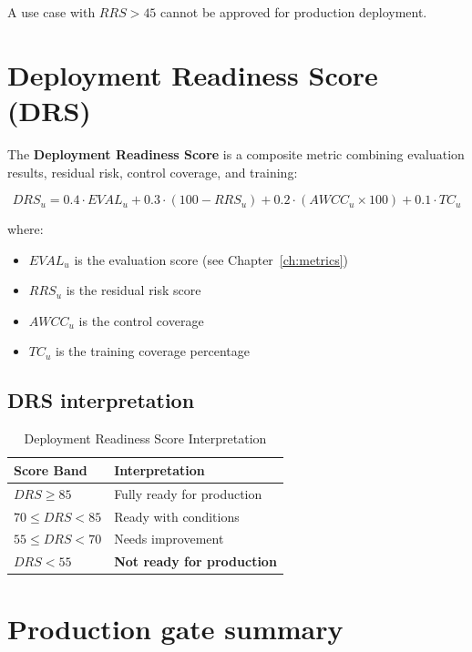 \begin{tcolorbox}[colback=sgred!5,colframe=sgred!70,title=\faIcon{exclamation-circle} Production Gate]
A use case with $RRS > 45$ cannot be approved for production deployment.
\end{tcolorbox}

\section{Deployment Readiness Score (DRS)}

The \textbf{Deployment Readiness Score} is a composite metric combining
evaluation results, residual risk, control coverage, and training:

\begin{equation}
\boxed{
DRS_u = 0.4 \cdot EVAL_u + 0.3 \cdot (100 - RRS_u) + 0.2 \cdot (AWCC_u \times 100) + 0.1 \cdot TC_u
}
\label{eq:drs}
\end{equation}

where:
\begin{itemize}
  \item $EVAL_u$ is the evaluation score (see Chapter~\ref{ch:metrics})
  \item $RRS_u$ is the residual risk score
  \item $AWCC_u$ is the control coverage
  \item $TC_u$ is the training coverage percentage
\end{itemize}

\subsection{DRS interpretation}

\begin{table}[htbp]
\centering
\caption{Deployment Readiness Score Interpretation}
\begin{tabular}{l l}
\toprule
\textbf{Score Band} & \textbf{Interpretation} \\
\midrule
$DRS \geq 85$ & Fully ready for production \\
$70 \leq DRS < 85$ & Ready with conditions \\
$55 \leq DRS < 70$ & Needs improvement \\
$DRS < 55$ & \textbf{Not ready for production} \\
\bottomrule
\end{tabular}
\end{table}

\section{Production gate summary}

